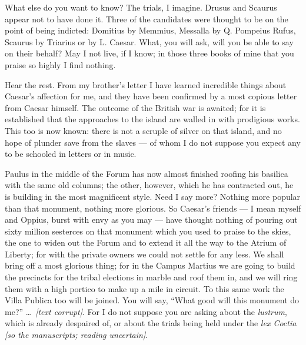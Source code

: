  What else do you want to know? The trials, I imagine. Drusus and Scaurus appear not to have done it. Three of the candidates were thought to be on the point of being indicted: Domitius by Memmius, Messalla by Q. Pompeius Rufus, Scaurus by Triarius or by L. Caesar. What, you will ask, will you be able to say on their behalf? May I not live, if I know; in those three books of mine that you praise so highly I find nothing.

 Hear the rest. From my brother's letter I have learned incredible things about Caesar's affection for me, and they have been confirmed by a most copious letter from Caesar himself. The outcome of the British war is awaited; for it is established that the approaches to the island are walled in with prodigious works. This too is now known: there is not a scruple of silver on that island, and no hope of plunder save from the slaves --- of whom I do not suppose you expect any to be schooled in letters or in music.

 Paulus in the middle of the Forum has now almost finished roofing his basilica with the same old columns; the other, however, which he has contracted out, he is building in the most magnificent style. Need I say more? Nothing more popular than that monument, nothing more glorious. So Caesar's friends --- I mean myself and Oppius, burst with envy as you may --- have thought nothing of pouring out sixty million sesterces on that monument which you used to praise to the skies, the one to widen out the Forum and to extend it all the way to the Atrium of Liberty; for with the private owners we could not settle for any less. We shall bring off a most glorious thing; for in the Campus Martius we are going to build the precincts for the tribal elections in marble and roof them in, and we will ring them with a high portico to make up a mile in circuit. To this same work the Villa Publica too will be joined. You will say, ``What good will this monument do me?'' \dots\ \textit{[text corrupt]}. For I do not suppose you are asking about the \textit{lustrum}, which is already despaired of, or about the trials being held under the \textit{lex Coctia} \textit{[so the manuscripts; reading uncertain]}.
